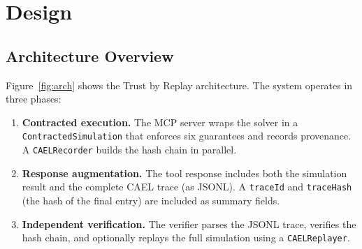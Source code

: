 \documentclass[letterpaper,twocolumn,10pt]{article}
\begin{document}

\section{Design}
\label{sec:design}

\subsection{Architecture Overview}

Figure~\ref{fig:arch} shows the Trust by Replay architecture. The system
operates in three phases:

\begin{enumerate}[nosep,leftmargin=*]
\item \textbf{Contracted execution.} The MCP server wraps the solver in a
  \texttt{ContractedSimulation} that enforces six guarantees and records
  provenance. A \texttt{CAELRecorder} builds the hash chain in parallel.
\item \textbf{Response augmentation.} The tool response includes both the
  simulation result and the complete CAEL trace (as JSONL). A \texttt{traceId}
  and \texttt{traceHash} (the hash of the final entry) are included as
  summary fields.
\item \textbf{Independent verification.} The verifier parses the JSONL trace,
  verifies the hash chain, and optionally replays the full simulation using a
  \texttt{CAELReplayer}.
\end{enumerate}
\end{document}
